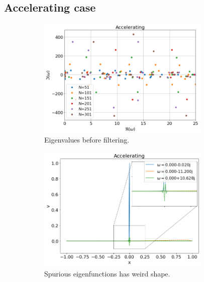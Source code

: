 \documentclass{article}
\begin{document}
    \subsection*{Accelerating case}
    \begin{figure}[H]
        \centering
        \begin{subfigure}[b]{0.5\textwidth}
            \includegraphics*[width=0.9\textwidth]{img/eigvals-accelerating.png}
            \caption{Eigenvalues before filtering.}
        \end{subfigure}%
        \begin{subfigure}[b]{0.5\textwidth}
            \includegraphics*[width=0.9\textwidth]{img/eigfuncs-accelerating.png}
            \caption{Spurious eigenfunctions has weird shape.}
        \end{subfigure}
        \begin{subfigure}[b]{0.5\textwidth}

\end{subfigure}
\end{figure}
\end{document}
